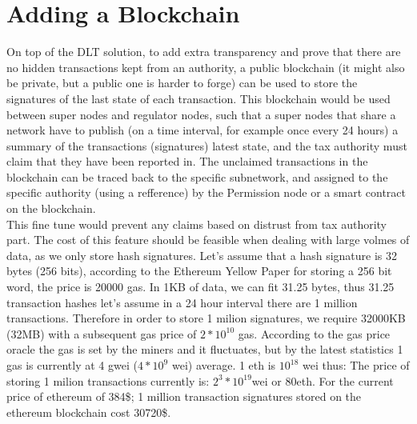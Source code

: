 \section{Adding a Blockchain}
On top of the DLT solution, to add extra transparency and prove that there are no hidden transactions kept from an authority, a public blockchain (it might also be private, but a public one is harder to forge) can be used to store the signatures of the last state of each transaction. This blockchain would be used between super nodes and regulator nodes, such that a super nodes that share a network have to publish (on a time interval, for example once every 24 hours) a summary of the transactions (signatures) latest state, and the tax authority must claim that they have been reported in. The unclaimed transactions in the blockchain can be traced back to the specific subnetwork, and assigned to the specific authority (using a refference) by the Permission node or a smart contract on the blockchain.\\
This fine tune would prevent any claims based on distrust from tax authority part. The cost of this feature should be feasible when dealing with large volmes of data, as we only store hash signatures. Let's assume that a hash signature is 32 bytes (256 bits), according to the Ethereum Yellow Paper\cite{yellow} for storing a 256 bit word, the price is 20000 gas. In 1KB of data, we can fit 31.25 bytes, thus 31.25 transaction hashes let's assume in a 24 hour interval there are 1 million transactions. Therefore in order to store 1 milion signatures, we require 32000KB (32MB) with a subsequent gas price of $2*10^{10}$ gas. According to the gas price oracle\cite{gas} the gas is set by the miners and it fluctuates, but by the latest statistics\cite{ethgas} 1 gas is currently at 4 gwei ($4*10^9$ wei) average. 1 eth is $10^{18}$ wei\cite{yellow} thus: The price of storing 1 milion transactions currently is: $2^3*10^{19}$wei or $80$eth. For the current price of ethereum of 384\$\cite{eth}; 1 million transaction signatures stored on the ethereum blockchain cost 30720\$.
